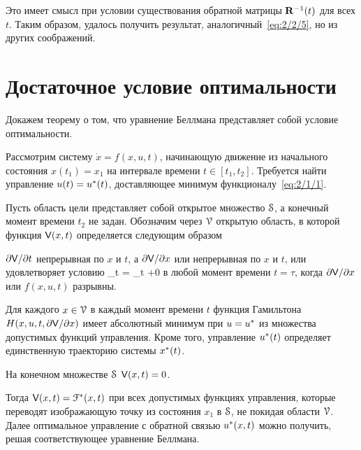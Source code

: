 Это имеет смысл при условии существования обратной матрицы $\mathbf{R}^{-1}(t)$ для всех $t$. Таким образом, удалось получить результат, аналогичный~\vref{eq:2/2/5}, но из других соображений.



\section{Достаточное условие оптимальности}



Докажем теорему о том, что уравнение Беллмана представляет собой условие оптимальности\cite{TCHAMRAN}.

	Рассмотрим систему $\dot{x} = f(x, u, t)$, начинающую движение из начального состояния $x(t_1) = x_1$ на интервале времени $t \in [t_1, t_2]$. Требуется найти управление $u(t) = u^{*}(t)$, доставляющее минимум функционалу~\vref{eq:2/1/1}.
	
	Пусть область цели представляет собой открытое множество $\mathcal{S}$, а конечный момент времени $t_2$ не задан. Обозначим через $\mathcal{V}$ открытую область, в которой функция $\mathsf{V}(x, t)$ определяется следующим образом
	
	\benum
		\item
			$\partial {  \mathsf{V}  } / \partial {t}$ непрерывная по $x$ и $t$, а $\partial {  \mathsf{V}  } / \partial {x}$ или непрерывная по $x$ и $t$, или удовлетворяет условию
    			\lim\limits_{t \to {}}  = \lim\limits_{t \to \tau+0} 
			\eeq
			в любой момент времени $t = \tau$, когда $\partial {  \mathsf{V}  } / \partial {x}$ или $f(x, u, t)$ разрывны.
			
		\item
			Для каждого $x \in \mathcal{V}$ в каждый момент времени $t$ функция Гамильтона $H(x, u, t, \partial {  \mathsf{V}  } / \partial {x})$ имеет абсолютный минимум при $u = u^{*}$ из множества допустимых функций управления. Кроме того, управление $u^{*}(t)$ определяет единственную траекторию системы $x^{*}(t)$.
			
		\item
			На конечном множестве $\mathcal{S}$ $\mathsf{V}(x, t) = 0$.
	\eenum
	
	Тогда $\mathsf{V}(x, t) = \mathcal{F}^{*}(x, t)$ при всех допустимых функциях управления, которые переводят изображающую точку из состояния $x_1$ в $\mathcal{S}$, не покидая области $\mathcal{V}$. Далее оптимальное управление с обратной связью $u^{*}(x, t)$ можно получить, решая соответствующее уравнение Беллмана.
\eteo


